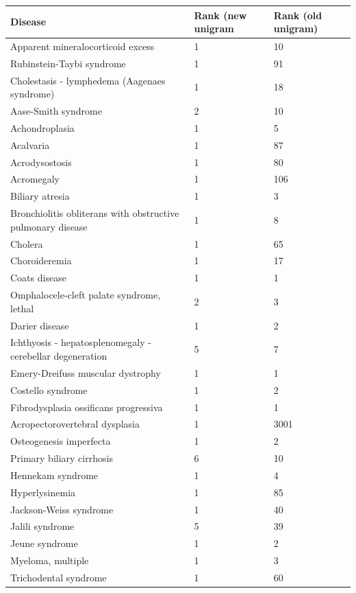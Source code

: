 \documentclass[10pt,letterpaper,final]{article}
\begin{document}
\begin{center}
\begin{small}
	\begin{longtable}{|p{6cm}|p{1.8cm}|p{1.8cm}|}	\hline
	\textbf{Disease}  & \textbf{Rank (new unigram} & \textbf{Rank (old unigram)} \\
    \hline\hline
    Apparent mineralocorticoid excess &1 & 10\\    \hline
    Rubinstein-Taybi syndrome  & 1 & 91\\    \hline
    Cholestasis - lymphedema  (Aagenaes syndrome) & 1 & 18\\    \hline
    Aase-Smith syndrome  & 2 & 10\\    \hline
    Achondroplasia  & 1 & 5\\    \hline
    Acalvaria  &  1 & 87\\    \hline
    Acrodysostosis & 1 & 80\\    \hline
    Acromegaly & 1 & 106\\    \hline
    Biliary atresia  & 1 & 3\\    \hline
    Bronchiolitis obliterans with obstructive pulmonary disease  & 1 & 8\\    \hline
    Cholera &  1 & 65\\    \hline
    Choroideremia & 1 & 17\\    \hline
    Coats disease & 1 & 1\\    \hline
    Omphalocele-cleft palate syndrome, lethal & 2 & 3\\    \hline
    Darier disease & 1 & 2\\    \hline
    Ichthyosis - hepatosplenomegaly - cerebellar degeneration & 5 & 7\\    \hline
    Emery-Dreifuss muscular dystrophy & 1 & 1\\    \hline
    Costello syndrome & 1 & 2\\    \hline
    Fibrodysplasia ossificans progressiva & 1 & 1\\    \hline
    Acropectorovertebral dysplasia & 1 & 3001\\    \hline
    Osteogenesis imperfecta & 1 & 2\\    \hline
    Primary biliary cirrhosis & 6 & 10\\    \hline
    Hennekam syndrome  & 1 & 4\\    \hline
    Hyperlysinemia& 1 & 85\\    \hline
    Jackson-Weiss syndrome & 1 & 40\\    \hline
    Jalili syndrome &  5 & 39 \\    \hline
    Jeune syndrome & 1 & 2\\    \hline
    Myeloma, multiple & 1 & 3\\    \hline
    Trichodental syndrome & 1 & 60\\    \hline
    \end{longtable}
\end{small}
\end{center}
\end{document}
